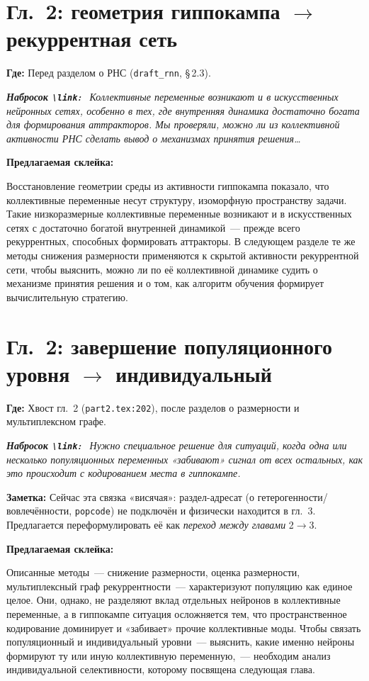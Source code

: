 \documentclass[12pt,a4paper]{article}
\newenvironment{sketch}{%
  \begin{mdframed}[backgroundcolor=black!4, linecolor=black!25, linewidth=0.4pt,
    innertopmargin=5pt, innerbottommargin=5pt]\small\itshape
  \textbf{\upshape Набросок \texttt{\textbackslash link}:}\ }{%
  \end{mdframed}}
\newenvironment{glue}{%
  \begin{mdframed}[backgroundcolor=green!5, linecolor=green!40!black, linewidth=0.6pt,
    innertopmargin=5pt, innerbottommargin=5pt]
  \textbf{Предлагаемая склейка:}\par\smallskip}{%
  \end{mdframed}}
\newcommand{\loc}[1]{\par\noindent\textcolor{blue!55!black}{\textbf{Где:} #1}\par}
\newcommand{\note}[1]{\par\noindent\textcolor{red!60!black}{\textbf{Заметка:} #1}\par}
\begin{document}
\section{Гл.~2: геометрия гиппокампа $\to$ рекуррентная сеть}
\loc{Перед разделом о РНС (\texttt{draft\_rnn}, \S\,2.3).}
\begin{sketch}
Коллективные переменные возникают и в искусственных нейронных сетях, особенно
в тех, где внутренняя динамика достаточно богата для формирования аттракторов.
Мы проверяли, можно ли из коллективной активности РНС сделать вывод о механизмах
принятия решения\ldots
\end{sketch}
\begin{glue}
Восстановление геометрии среды из активности гиппокампа показало, что коллективные
переменные несут структуру, изоморфную пространству задачи. Такие низкоразмерные
коллективные переменные возникают и в искусственных сетях с достаточно богатой
внутренней динамикой~--- прежде всего рекуррентных, способных формировать
аттракторы. В следующем разделе те же методы снижения размерности применяются
к скрытой активности рекуррентной сети, чтобы выяснить, можно ли по её
коллективной динамике судить о механизме принятия решения и о том, как алгоритм
обучения формирует вычислительную стратегию.
\end{glue}

\section{Гл.~2: завершение популяционного уровня $\to$ индивидуальный}
\loc{Хвост гл.~2 (\texttt{part2.tex:202}), после разделов о размерности и
мультиплексном графе.}
\begin{sketch}
Нужно специальное решение для ситуаций, когда одна или несколько популяционных
переменных «забивают» сигнал от всех остальных, как это происходит с кодированием
места в гиппокампе.
\end{sketch}
\note{Сейчас эта связка «висячая»: раздел-адресат (о гетерогенности/вовлечённости,
\texttt{popcode}) не подключён и физически находится в гл.~3. Предлагается
переформулировать её как \emph{переход между главами} 2$\to$3.}
\begin{glue}
Описанные методы~--- снижение размерности, оценка размерности, мультиплексный
граф рекуррентности~--- характеризуют популяцию как единое целое. Они, однако,
не разделяют вклад отдельных нейронов в коллективные переменные, а в гиппокампе
ситуация осложняется тем, что пространственное кодирование доминирует и «забивает»
прочие коллективные моды. Чтобы связать популяционный и индивидуальный уровни~---
выяснить, какие именно нейроны формируют ту или иную коллективную переменную,~---
необходим анализ индивидуальной селективности, которому посвящена следующая глава.
\end{glue}
\end{document}
